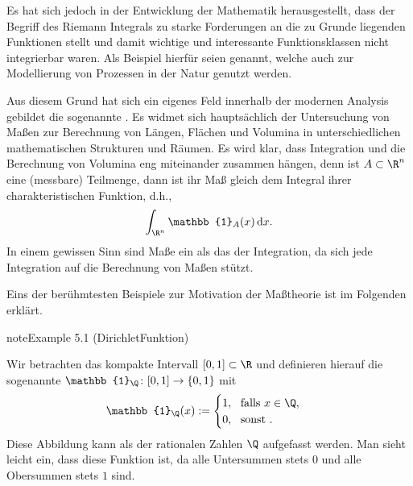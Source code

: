 \documentclass[letterpaper,10pt,german]{jupyterBook}
\begin{document}
\sphinxAtStartPar
Es hat sich jedoch in der Entwicklung der Mathematik herausgestellt, dass der Begriff des Riemann Integrals zu starke Forderungen an die zu Grunde liegenden Funktionen stellt und damit wichtige und interessante Funktionsklassen nicht integrierbar waren.
Als Beispiel hierfür seien  genannt, welche auch zur Modellierung von Prozessen in der Natur genutzt werden.

\sphinxAtStartPar
Aus diesem Grund hat sich ein eigenes Feld innerhalb der modernen Analysis gebildet \sphinxhyphen{} die sogenannte .
Es widmet sich hauptsächlich der Untersuchung von Maßen zur Berechnung von Längen, Flächen und Volumina in unterschiedlichen mathematischen Strukturen und Räumen.
Es wird klar, dass Integration und die Berechnung von Volumina eng miteinander zusammen hängen, denn ist \(A\subset\R^n\) eine (messbare) Teilmenge, dann ist ihr Maß gleich dem Integral ihrer charakteristischen Funktion, d.h.,
\begin{equation*}
\begin{split}\int_{\R^n} \mathbb{1}_A(x)\,\mathrm{d}x.\end{split}
\end{equation*}
\sphinxAtStartPar
In einem gewissen Sinn sind Maße ein  als das der Integration, da sich jede Integration auf die Berechnung von Maßen stützt.

\sphinxAtStartPar
Eins der berühmtesten Beispiele zur Motivation der Maßtheorie ist im Folgenden erklärt.
\label{masstheorie/intro_masstheorie:ex:dirichletFunktion}
\begin{sphinxadmonition}{note}{Example 5.1 (Dirichlet\sphinxhyphen{}Funktion)}



\sphinxAtStartPar
Wir betrachten das kompakte Intervall \([0,1] \subset \R\) und definieren hierauf die sogenannte  \(\mathbb{1}_\Q \colon [0,1] \rightarrow \{0,1\}\) mit
\begin{equation*}
\begin{split}\mathbb{1}_\Q(x) := \begin{cases} 1, \ \text{ falls } x \in \Q, \\ 0, \ \text{ sonst }.\end{cases}\end{split}
\end{equation*}
\sphinxAtStartPar
Diese Abbildung kann als  der rationalen Zahlen \(\Q\) aufgefasst werden.
Man sieht leicht ein, dass diese Funktion  ist, da alle Untersummen stets \(0\) und alle Obersummen stets \(1\) sind.
\end{sphinxadmonition}
\end{document}
